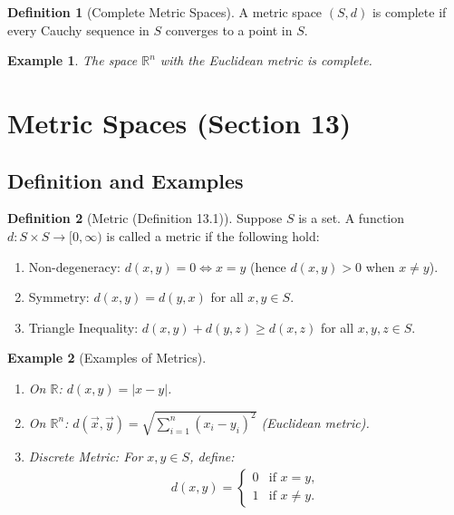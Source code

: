 \documentclass[9pt]{article}
\theoremstyle{definition}
\newtheorem{definition}{Definition}
\theoremstyle{plain}
\newtheorem{example}{Example}
\begin{document}
\begin{definition}[Complete Metric Spaces]
A metric space $ (S, d) $ is complete if every Cauchy sequence in $ S $ converges to a point in $ S $.
\end{definition}

\begin{example}
The space $ \mathbb{R}^n $ with the Euclidean metric is complete.
\end{example}
\section*{Metric Spaces (Section 13)}

\subsection*{Definition and Examples}
\begin{definition}[Metric (Definition 13.1)]
Suppose $ S $ is a set. A function $ d : S \times S \to [0, \infty) $ is called a metric if the following hold:
\begin{enumerate}[label=(D\arabic*)]
    \item {Non-degeneracy:} $ d(x, y) = 0 \iff x = y $ (hence $ d(x, y) > 0 $ when $ x \neq y $).
    \item {Symmetry:} $ d(x, y) = d(y, x) $ for all $ x, y \in S $.
    \item {Triangle Inequality:} $ d(x, y) + d(y, z) \geq d(x, z) $ for all $ x, y, z \in S $.
\end{enumerate}
\end{definition}

\begin{example}[Examples of Metrics]

\begin{enumerate}
    \item On $ \mathbb{R} $: $ d(x, y) = |x - y| $.
    \item On $ \mathbb{R}^n $: $ d(\vec{x}, \vec{y}) = \sqrt{\sum_{i=1}^n (x_i - y_i)^2} $ (Euclidean metric).
    \item Discrete Metric: For $ x, y \in S $, define:
    \begin{align}
    d(x, y) = 
    \begin{cases} 
    0 & \text{if } x = y, \\
    1 & \text{if } x \neq y.
    \end{cases}
    \end{align}
\end{enumerate}
\end{example}
\end{document}
